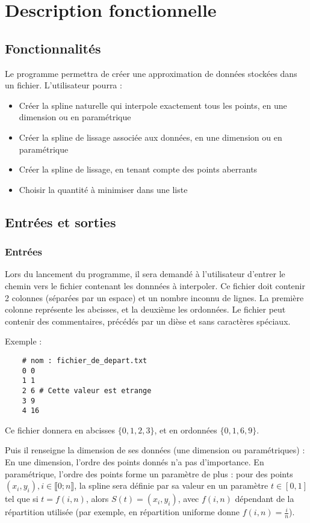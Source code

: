 \documentclass[a4paper,12pt]{article}
\begin{document}
\section{Description fonctionnelle}

\subsection{Fonctionnalités}
\label{Fonctions}

Le programme permettra de créer une approximation de données stockées dans un fichier. L'utilisateur pourra :
\begin{itemize}
\item Créer la spline naturelle qui interpole exactement tous les points, en une dimension ou en paramétrique
\item Créer la spline de lissage associée aux données, en une dimension ou en paramétrique
\item Créer la spline de lissage, en tenant compte des points aberrants
\item Choisir la quantité à minimiser dans une liste
\end{itemize}

\newpage
\subsection{Entrées et sorties}

\subsubsection{Entrées}

Lors du lancement du programme, il sera demandé à l'utilisateur d'entrer le chemin vers le fichier contenant les donnnées à interpoler.
Ce fichier doit contenir 2 colonnes (séparées par un espace) et un nombre inconnu de lignes. La première colonne représente les abcisses, et la deuxième les ordonnées. Le fichier peut contenir des commentaires, précédés par un dièse et sans caractères spéciaux.

Exemple :

\begin{lstlisting}
    # nom : fichier_de_depart.txt
    0 0
    1 1
    2 6 # Cette valeur est etrange
    3 9
    4 16
\end{lstlisting}

Ce fichier donnera en abcisses  $\{0,1,2,3\}$, et en ordonnées $\{0,1,6,9\}$.

Puis il renseigne la dimension de ses données (une dimension ou paramétriques) : En une dimension, l'ordre des points donnés n'a pas d'importance. En paramétrique, l'ordre des points forme un paramètre de plus : pour des points $(x_i,y_i),i\in \llbracket 0; n \rrbracket$, la spline sera définie par sa valeur en un paramètre $t \in [0,1]$ tel que si $t = f(i,n) $, alors $S(t) = (x_i,y_i)$, avec $f(i,n)$ dépendant de la répartition utilisée (par exemple, en répartition uniforme donne $f(i,n) = \frac{i}{n}$). 
\end{document}
